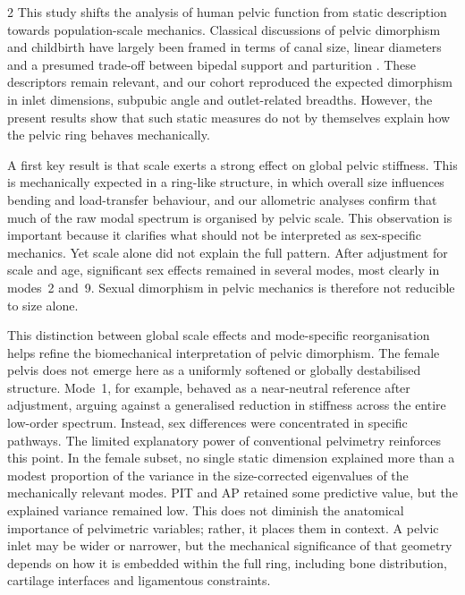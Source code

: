 \documentclass[openacc]{rsproca_new}
\begin{document}
\begin{multicols}{2}
This study shifts the analysis of human pelvic function from static description towards population-scale mechanics. Classical discussions of pelvic dimorphism and childbirth have largely been framed in terms of canal size, linear diameters and a presumed trade-off between bipedal support and parturition \cite{RosenbergTrevathan2002,Trevathan2015,Grunstra2023}. These descriptors remain relevant, and our cohort reproduced the expected dimorphism in inlet dimensions, subpubic angle and outlet-related breadths. However, the present results show that such static measures do not by themselves explain how the pelvic ring behaves mechanically.

A first key result is that scale exerts a strong effect on global pelvic stiffness. This is mechanically expected in a ring-like structure, in which overall size influences bending and load-transfer behaviour, and our allometric analyses confirm that much of the raw modal spectrum is organised by pelvic scale. This observation is important because it clarifies what should not be interpreted as sex-specific mechanics. Yet scale alone did not explain the full pattern. After adjustment for scale and age, significant sex effects remained in several modes, most clearly in modes~2 and~9. Sexual dimorphism in pelvic mechanics is therefore not reducible to size alone.

This distinction between global scale effects and mode-specific reorganisation helps refine the biomechanical interpretation of pelvic dimorphism. The female pelvis does not emerge here as a uniformly softened or globally destabilised structure. Mode~1, for example, behaved as a near-neutral reference after adjustment, arguing against a generalised reduction in stiffness across the entire low-order spectrum. Instead, sex differences were concentrated in specific pathways. 
The limited explanatory power of conventional pelvimetry reinforces this point. In the female subset, no single static dimension explained more than a modest proportion of the variance in the size-corrected eigenvalues of the mechanically relevant modes. PIT and AP retained some predictive value, but the explained variance remained low. This does not diminish the anatomical importance of pelvimetric variables; rather, it places them in context. A pelvic inlet may be wider or narrower, but the mechanical significance of that geometry depends on how it is embedded within the full ring, including bone distribution, cartilage interfaces and ligamentous constraints.


\end{multicols}
\end{document}
